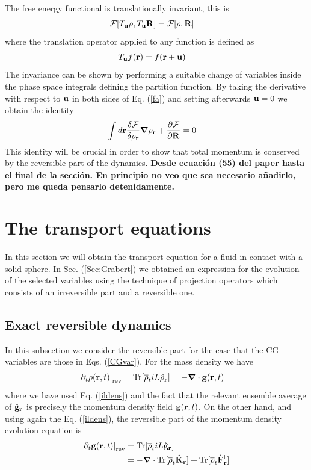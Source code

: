 \documentclass[b5paper,openright,11pt]{book}
\newcommand{\Note}[1]{{\bf \color{red}#1}}    %
\begin{document}
The free energy functional is translationally invariant, this is
\begin{align}
  {\cal F}[T_{\bf u}\rho,T_{\bf u}{\bf R}]&=  {\cal F}[\rho,{\bf R}]
\label{fa}
\end{align}
where the translation operator applied to any function is defined as
\begin{align}
  T_{\bf u}f({\bf r})&=f({\bf r}+{\bf u})
\end{align}
The  invariance  can be  shown  by  performing  a suitable  change  of
variables  inside the  phase space  integrals defining  the partition
function.  By taking the derivative with  respect to ${\bf u}$ in both
sides of Eq.  (\ref{fa}) and  setting afterwards ${\bf u}=0$ we obtain
the identity
\begin{align}
  \int d{\bf r}\frac{\delta {\cal F}}{\delta \rho_{\bf r}}
\boldsymbol{\nabla}\rho_{\bf r}&+\frac{\partial {\cal F}}{\partial {\bf R}}=0
\label{iden1}
\end{align}
This  identity will be  crucial in  order to  show that  total  momentum is
conserved by  the reversible part  of the dynamics.  
\Note{Desde ecuación (55) del paper hasta el final de la sección. En principio no veo que sea necesario añadirlo, pero me queda pensarlo detenidamente.}

\section{The transport equations}
In this section we will obtain the transport equation for a fluid in contact with a solid sphere. In Sec. (\ref{Sec:Grabert}) we obtained an expression for the evolution of the selected variables using the technique of projection operators which consists of an irreversible part and a reversible one. 
\subsection{Exact reversible dynamics}\label{Sec:ExactCont}
In this subsection we consider the reversible part for the case that the CG variables are those in Eqs. (\ref{CGvar}).
For the mass density we have
\begin{align}
\left.\partial_t \rho({\bf r},t)\right|_{\rm rev}
&=  {\rm Tr}[\overline{\rho}_t  iL\hat{\rho}_{\bf r}] 
=-\boldsymbol{\nabla}\cdot {\bf  g}({\bf r},t)
\label{conrho}
\end{align}
where we have used Eq. (\ref{ildens}) and the fact that the relevant
ensemble average of $\hat{\bf g}_{\bf  r}$ is precisely  the momentum
density field ${\bf g}({\bf r},t)$.  On the other hand, and using again the Eq. (\ref{ildens}), the reversible
part of the momentum density evolution equation is
\begin{align}
\left.\partial_t {\bf g}({\bf r},t)\right|_{\rm rev}
&=  {\rm Tr}[\overline{\rho}_t  iL\hat{{\bf g}}_{\bf r}] 
\nonumber\\
&=-\boldsymbol{\nabla}\cdot  {\rm Tr}[\overline{\rho}_t \hat{{\bf K}}_{\bf r}] 
+  {\rm Tr}[\overline{\rho}_t  \hat{\bf F}^{\rm l}_{\bf r}]
\label{grev1}
\end{align}
\end{document}
